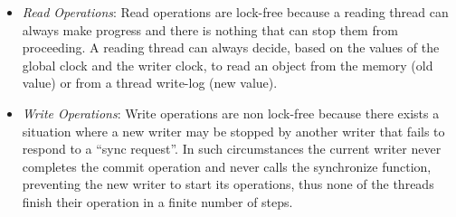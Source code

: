 \begin{refsection}
\begin{itemize}
\item \emph{Read Operations}: Read operations are lock-free because a reading
  thread can always make progress and there is nothing that can stop them from
  proceeding.
  A reading thread can always decide, based on the values of the global clock
  and the writer clock, to read an object from the memory (old value) or from
  a thread write-log (new value).
\item \emph{Write Operations}: Write operations are non lock-free because
  there exists a situation where a new writer may be stopped by another writer
  that fails to respond to a ``sync request''.
  In such circumstances the current writer never completes the commit
  operation and never calls the synchronize function, preventing the new
  writer to start its operations, thus none of the threads finish their
  operation in a finite number of steps.
\end{itemize}

\vspace{-10pt}
\printbibliography

\end{refsection}

